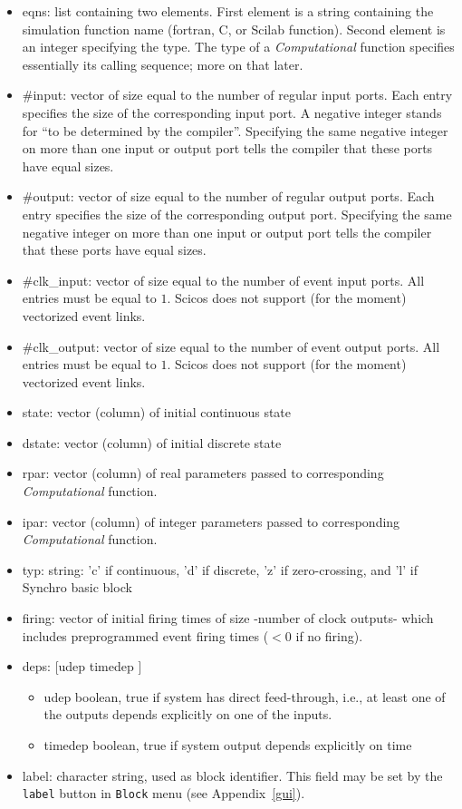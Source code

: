 \documentclass{book}
\newcommand{\logical}{{Synchro }}
\newcommand{\computational}{{\em Computational }}
\begin{document}
\begin{itemize}
\item eqns: \label{eqns} list containing two elements. First element is a string containing
the simulation function name (fortran, C, or Scilab function). Second element
is an integer specifying the type. The type of a \computational
function specifies essentially its calling sequence; more on that later.
\item \#input: vector of size equal to the number of regular input ports. Each entry
specifies the size of the corresponding input port. A negative integer stands for 
``to be determined by the compiler''. Specifying the same negative integer on
more than one input or output port tells the compiler that these ports have
equal sizes. 
\item \#output: vector of size equal to the number of regular output ports. Each entry
specifies the size of the corresponding output port. Specifying the same negative integer on
more than one input or output port tells the compiler that these ports have
equal sizes. 
\item \#clk\_input: vector of size equal to the number 
of event input ports. All entries
must be equal to $1$. Scicos does not support (for the moment) vectorized event links.

\item \#clk\_output: vector of size equal to the 
number of event output ports. All entries
must be equal to $1$. Scicos does not support (for the moment) vectorized event links.

\item state: vector (column) of initial continuous state
\item dstate: vector (column) of initial discrete state
\item rpar: vector (column) of real parameters passed to corresponding
\computational function.
\item ipar: vector (column) of integer parameters passed to
corresponding \computational function.
\item typ: string: 'c' if continuous, 'd' if discrete, 'z' if zero-crossing, and
'l' if \logical basic block
\item firing: vector of initial firing times of size -number of clock
outputs- which includes preprogrammed event firing times ($<$0
if no firing). 

\item deps: [udep timedep ] 
  \begin{itemize}
  \item udep boolean, true if system has direct feed-through, i.e., at least
one of the outputs depends explicitly on one of the inputs.
  \item timedep boolean, true if system output depends explicitly on time
  \end{itemize}
\item label: character string, used as block identifier. This field
  may be set by the {\tt label} button in {\tt Block} menu (see
  Appendix~\ref{gui}).
\end{itemize}
\end{document}

